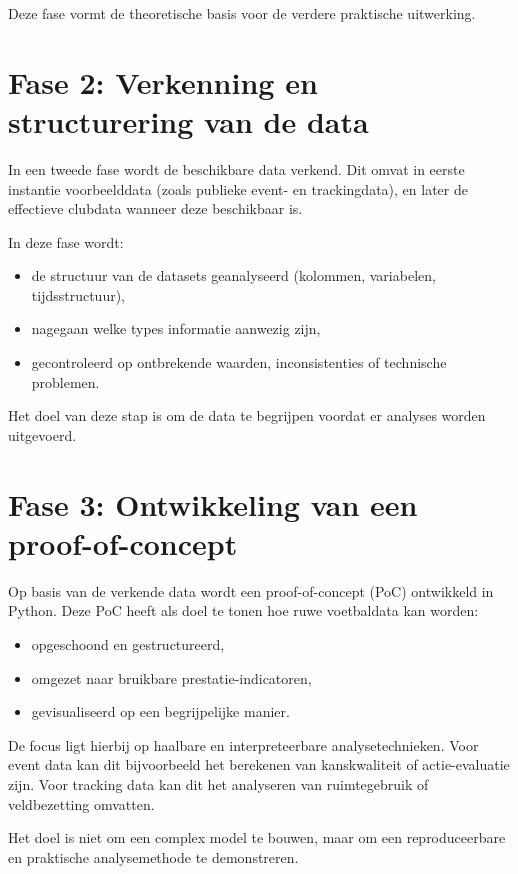Deze fase vormt de theoretische basis voor de verdere praktische uitwerking.

\section{Fase 2: Verkenning en structurering van de data}

In een tweede fase wordt de beschikbare data verkend.
Dit omvat in eerste instantie voorbeelddata (zoals publieke event- en trackingdata), en later de effectieve clubdata wanneer deze beschikbaar is.

In deze fase wordt:

\begin{itemize}
    \item de structuur van de datasets geanalyseerd (kolommen, variabelen, tijdsstructuur),
    \item nagegaan welke types informatie aanwezig zijn,
    \item gecontroleerd op ontbrekende waarden, inconsistenties of technische problemen.
\end{itemize}

Het doel van deze stap is om de data te begrijpen voordat er analyses worden uitgevoerd.

\section{Fase 3: Ontwikkeling van een proof-of-concept}

Op basis van de verkende data wordt een proof-of-concept (PoC) ontwikkeld in Python.
Deze PoC heeft als doel te tonen hoe ruwe voetbaldata kan worden:

\begin{itemize}
    \item opgeschoond en gestructureerd,
    \item omgezet naar bruikbare prestatie-indicatoren,
    \item gevisualiseerd op een begrijpelijke manier.
\end{itemize}

De focus ligt hierbij op haalbare en interpreteerbare analysetechnieken.
Voor event data kan dit bijvoorbeeld het berekenen van kanskwaliteit of actie-evaluatie zijn.
Voor tracking data kan dit het analyseren van ruimtegebruik of veldbezetting omvatten.

Het doel is niet om een complex model te bouwen, maar om een reproduceerbare en praktische analysemethode te demonstreren.

